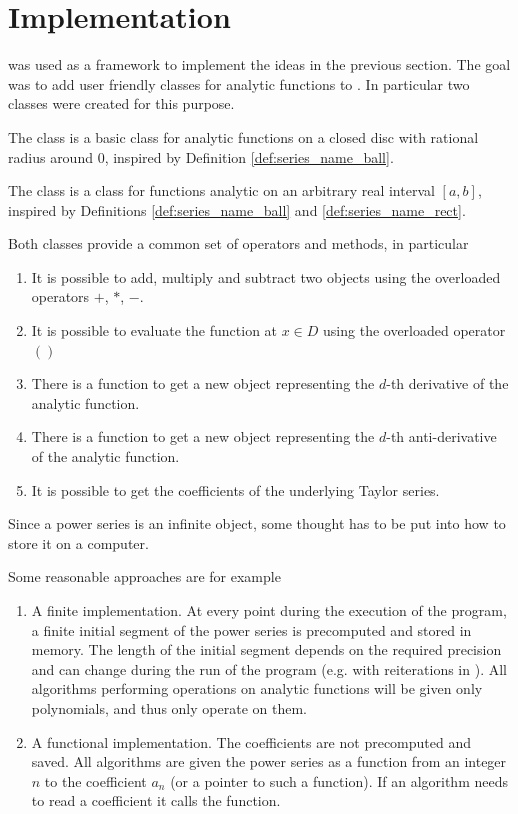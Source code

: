 	\section{Implementation}
		\irram was used as a framework to implement the ideas in the previous section.
		The goal was to add user friendly classes for analytic functions to \irram.
		In particular two classes were created for this purpose.

		The class \baana is a basic class for analytic functions on 
		a closed disc with rational radius around $0$, inspired by Definition \ref{def:series_name_ball}.

		The class \anarect is a class for functions analytic on an arbitrary real interval $[a,b]$, 
		inspired by Definitions \ref{def:series_name_ball} and \ref{def:series_name_rect}.

		Both classes provide a common set of operators and methods, in particular
		\begin{enumerate}
			\item It is possible to add, multiply and subtract two objects using the overloaded operators $+$, $*$, $-$.
			\item It is possible to evaluate the function at $x \in D$ using the overloaded operator $()$
			\item There is a function  to get a new object representing the $d$-th derivative of the analytic function.
			\item There is a function  to get a new object representing the $d$-th anti-derivative of the analytic function.
			\item It is possible to get the coefficients of the underlying Taylor series.
		\end{enumerate}

    Since a power series is an infinite object, some thought has to be put into
    how to store it on a computer.

    Some reasonable approaches are for example
		\begin{enumerate}
			\item A finite implementation. 
        At every point during the execution of the program, a finite initial
        segment of the power series is precomputed and stored in memory.
        The length of the initial segment depends on the required precision and
        can change during the run of the program (e.g. with reiterations in
        \irram).
        All algorithms performing operations on analytic functions will be
        given only polynomials, and thus only operate on them.
			\item A functional implementation.
        The coefficients are not precomputed and saved.
        All algorithms are given the power series as a function from an integer $n$ to the coefficient
			$a_n$ (or a pointer to such a function).
      If an algorithm needs to read a coefficient it calls the function.
		\end{enumerate}
		
